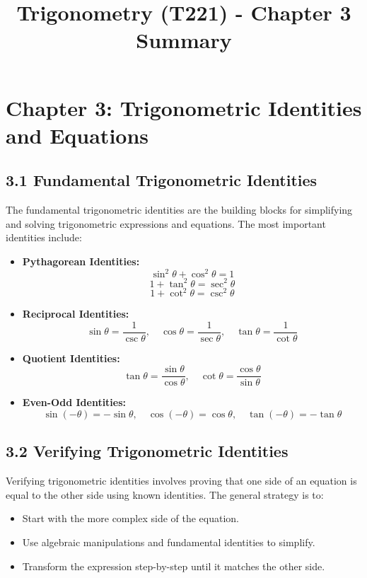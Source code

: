 \documentclass[12pt]{article}
\title{Trigonometry (T221) - Chapter 3 Summary}
\author{}
\date{}
\begin{document}
\maketitle

\section*{Chapter 3: Trigonometric Identities and Equations}

\subsection*{3.1 Fundamental Trigonometric Identities}
The fundamental trigonometric identities are the building blocks for simplifying and solving trigonometric expressions and equations. The most important identities include:

\begin{itemize}
    \item \textbf{Pythagorean Identities:}
    \[
    \sin^2\theta + \cos^2\theta = 1
    \]
    \[
    1 + \tan^2\theta = \sec^2\theta
    \]
    \[
    1 + \cot^2\theta = \csc^2\theta
    \]
    
    \item \textbf{Reciprocal Identities:}
    \[
    \sin\theta = \frac{1}{\csc\theta}, \quad \cos\theta = \frac{1}{\sec\theta}, \quad \tan\theta = \frac{1}{\cot\theta}
    \]
    
    \item \textbf{Quotient Identities:}
    \[
    \tan\theta = \frac{\sin\theta}{\cos\theta}, \quad \cot\theta = \frac{\cos\theta}{\sin\theta}
    \]
    
    \item \textbf{Even-Odd Identities:}
    \[
    \sin(-\theta) = -\sin\theta, \quad \cos(-\theta) = \cos\theta, \quad \tan(-\theta) = -\tan\theta
    \]
\end{itemize}

\subsection*{3.2 Verifying Trigonometric Identities}
Verifying trigonometric identities involves proving that one side of an equation is equal to the other side using known identities. The general strategy is to:

\begin{itemize}
    \item Start with the more complex side of the equation.
    \item Use algebraic manipulations and fundamental identities to simplify.
    \item Transform the expression step-by-step until it matches the other side.
\end{itemize}
\end{document}
